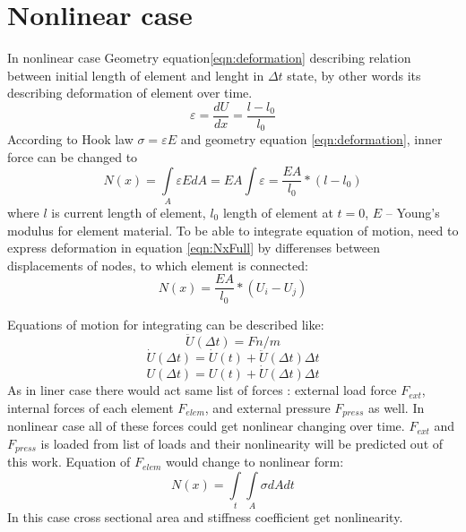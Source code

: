 \documentclass[12pt]{report}
\begin{document}
\section{Nonlinear case}
In nonlinear case Geometry equation\eqref{eqn:deformation} describing relation between initial length of
element and lenght in $\Delta t$ state, by other words its describing deformation of element over time.
\begin{equation}\label{eqn:deformation}
  \varepsilon=\frac{dU}{dx}=\frac{l-l_0}{l_0}
\end{equation}
According to Hook law $\sigma=\varepsilon E$ and geometry equation \eqref{eqn:deformation}, inner force can be changed to
\begin{equation}\label{eqn:NxFull}
  N(x)= \int\limits_A \varepsilon EdA=EA\int \varepsilon=\frac{EA}{l_0}*(l-l_0)
\end{equation}
where $l$ is current length of element, $l_0$ length of element at $t=0$, $E$ – Young’s modulus for element material.
To be able to integrate equation of motion, need to express deformation in equation \eqref{eqn:NxFull} by differenses 
between displacements of nodes, to which element is connected:
\begin{equation}\label{eqn:NxWdispl}
  N(x)=\frac{EA}{l_0}*(U_{i}-U_{j})
\end{equation}\par
Equations of motion for integrating can be described like:
\begin{equation}\label{eqn:Accel}
  \ddot{U}(\Delta t)=Fn/m
\end{equation}
\begin{equation}\label{eqn:Velos}
  \dot{U}(\Delta t)=\dot{U}(t)+\ddot{U}(\Delta t)\Delta t
\end{equation}
\begin{equation}\label{eqn:Displ}
  U(\Delta t)=U(t)+\dot{U}(\Delta t)\Delta t
\end{equation}
As in liner case there would act same list of forces : external load force $F_{ext}$,
internal forces of each element $F_{elem}$, and external pressure $F_{press}$ as well. In nonlinear case all 
of these forces could get nonlinear changing over time. $F_{ext}$ and $F_{press}$ is 
loaded from list of loads and their nonlinearity will be predicted out of this work. Equation of $F_{elem}$ would change to nonlinear form:
\begin{equation}\label{eqn:nNx}
  N(x)= \int\limits_t\int\limits_A \sigma dAdt
\end{equation}
In this case cross sectional area and stiffness coefficient get nonlinearity. \par
\end{document}
